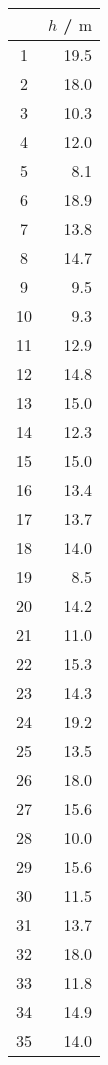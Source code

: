 \begin{multicols}{4}

    \begin{table}[H]
        \centering
        \begin{tabular}{|c|r|}
            \hline
            & $h$ / $\mathrm{m}$ \\
            \hline
            1 & 19.5 \\
            2 & 18.0 \\
            3 & 10.3 \\
            4 & 12.0 \\
            5 & 8.1 \\
            6 & 18.9 \\
            7 & 13.8 \\
            8 & 14.7 \\
            9 & 9.5 \\
            10 & 9.3 \\
            11 & 12.9 \\
            12 & 14.8 \\
            13 & 15.0 \\
            14 & 12.3 \\
            15 & 15.0 \\
            16 & 13.4 \\
            17 & 13.7 \\
            18 & 14.0 \\
            19 & 8.5 \\
            20 & 14.2 \\
            21 & 11.0 \\
            22 & 15.3 \\
            23 & 14.3 \\
            24 & 19.2 \\
            25 & 13.5 \\
            26 & 18.0 \\
            27 & 15.6 \\
            28 & 10.0 \\
            29 & 15.6 \\
            30 & 11.5 \\
            31 & 13.7 \\
            32 & 18.0 \\
            33 & 11.8 \\
            34 & 14.9 \\
            35 & 14.0 \\

\end{tabular}
\end{table}
\end{multicols}
